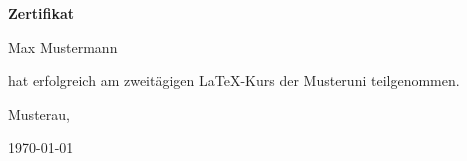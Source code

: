 \documentclass[16pt,ngerman]{scrartcl}
\begin{document}
\centering\Huge

\textbf{Zertifikat}
\vspace{20mm}
\begin{center}
Max Mustermann%
\end{center}
\vspace{1cm}\huge

hat erfolgreich am zweitägigen \LaTeX-Kurs der Musteruni teilgenommen. \vspace{2cm}\LARGE\flushleft

Musterau, \hfill\hdashrule[0.75ex]{9.5cm}{1pt}{2mm}

\today

\begin{center}
\vfill{}
\end{center}
\end{document}
